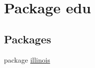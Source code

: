 \hypertarget{namespaceedu}{
\section{Package edu}
\label{namespaceedu}
}
\subsection*{Packages}
\begin{DoxyCompactItemize}
\item 
package \hyperlink{namespaceedu_1_1illinois}{illinois}
\end{DoxyCompactItemize}
